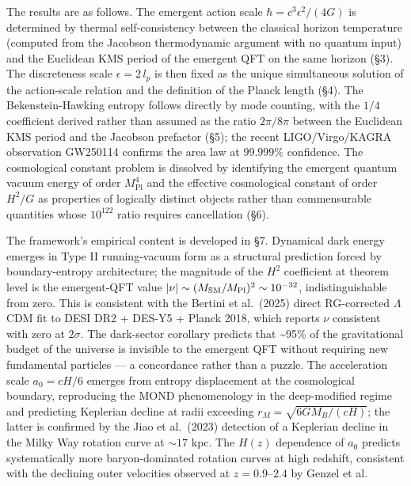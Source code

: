 \documentclass[
]{article}
\begin{document}
The results are as follows. The emergent action scale
\(\hbar = c^3 \epsilon^2 / (4G)\) is determined by thermal
self-consistency between the classical horizon temperature (computed
from the Jacobson thermodynamic argument with no quantum input) and the
Euclidean KMS period of the emergent QFT on the same horizon (§3). The
discreteness scale \(\epsilon = 2\,l_p\) is then fixed as the unique
simultaneous solution of the action-scale relation and the definition of
the Planck length (§4). The Bekenstein-Hawking entropy follows directly
by mode counting, with the \(1/4\) coefficient derived rather than
assumed as the ratio \(2\pi/8\pi\) between the Euclidean KMS period and
the Jacobson prefactor (§5); the recent LIGO/Virgo/KAGRA observation
GW250114 confirms the area law at \(99.999\%\) confidence. The
cosmological constant problem is dissolved by identifying the emergent
quantum vacuum energy of order \(M_{\text{Pl}}^4\) and the effective
cosmological constant of order \(H^2/G\) as properties of logically
distinct objects rather than commensurable quantities whose \(10^{122}\)
ratio requires cancellation (§6).

The framework's empirical content is developed in §7. Dynamical dark
energy emerges in Type II running-vacuum form as a structural prediction
forced by boundary-entropy architecture; the magnitude of the \(H^2\)
coefficient at theorem level is the emergent-QFT value
\(|\nu| \sim (M_{\rm SM}/M_{\rm Pl})^2 \sim 10^{-32}\),
indistinguishable from zero. This is consistent with the Bertini et
al.~(2025) direct RG-corrected \(\Lambda\)CDM fit to DESI DR2 + DES-Y5 +
Planck 2018, which reports \(\nu\) consistent with zero at \(2\sigma\).
The dark-sector corollary predicts that \textasciitilde95\% of the
gravitational budget of the universe is invisible to the emergent QFT
without requiring new fundamental particles --- a concordance rather
than a puzzle. The acceleration scale \(a_0 = cH/6\) emerges from
entropy displacement at the cosmological boundary, reproducing the MOND
phenomenology in the deep-modified regime and predicting Keplerian
decline at radii exceeding \(r_M = \sqrt{6 G M_B/(cH)}\); the latter is
confirmed by the Jiao et al.~(2023) detection of a Keplerian decline in
the Milky Way rotation curve at \(\sim 17\) kpc. The \(H(z)\) dependence
of \(a_0\) predicts systematically more baryon-dominated rotation curves
at high redshift, consistent with the declining outer velocities
observed at \(z = 0.9\)--\(2.4\) by Genzel et al.
\end{document}
